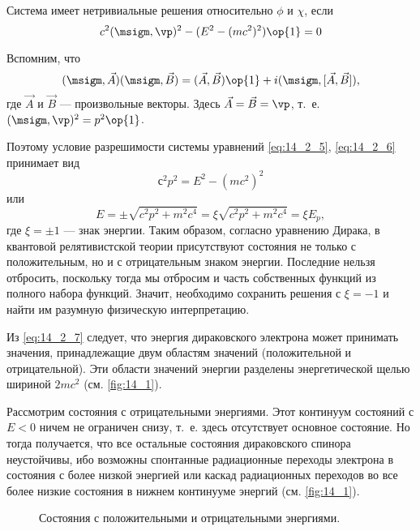 Система имеет нетривиальные решения относительно $\phi$ и $\chi$, если 
$$
c^2 (\msigm, \vp)^2 - (E^2 - (mc^2)^2)\op{1} = 0
$$

Вспомним, что 
$$
(\msigm, \vec{A})(\msigm, \vec{B}) = (\vec{A}, \vec{B}) \op{1} + i(\msigm, [\vec{A}, \vec{B}]),
$$
где $\vec A$ и $\vec B$ --- произвольные векторы. Здесь $\vec{A} = \vec{B} = \vp$, т.~е. $(\msigm, \vp)^2 = p^2 \op{1}$.

Поэтому условие разрешимости системы уравнений \eqref{eq:14_2_5}, \eqref{eq:14_2_6} принимает вид
$$
с^2 p^2 = E^2 - (mc^2)^2
$$
или
\begin{equation}
\label{eq:14_2_7}
\boxed{E = \pm \sqrt{c^2 p^2 + m^2 c^4} = \xi \sqrt{c^2p^2 + m^2 c^4} = \xi E_p},
\end{equation}
где $\xi = \pm 1$ --- знак энергии. Таким образом, согласно уравнению Дирака, в квантовой релятивистской теории присутствуют состояния не только с положительным, но и с отрицательным знаком энергии. Последние нельзя отбросить, поскольку тогда мы отбросим и часть собственных функций из полного набора функций. Значит, необходимо сохранить решения с $\xi = -1$ и найти им разумную физическую интерпретацию.

Из \eqref{eq:14_2_7} следует, что энергия дираковского электрона может принимать значения, принадлежащие двум областям значений (положительной и отрицательной). Эти области значений энергии разделены энергетической щелью шириной $2mc^2$ (см. \autoref{fig:14_1}).

Рассмотрим состояния с отрицательными энергиями. Этот континуум состояний с $E<0$ ничем не ограничен снизу, т.~е. здесь отсутствует основное состояние. Но тогда получается, что все остальные состояния дираковского спинора неустойчивы, ибо возможны спонтанные радиационные переходы электрона в состояния с более низкой энергией или каскад радиационных переходов во все более низкие состояния в нижнем континууме энергий (см. \autoref{fig:14_1}).

\begin{figure}[h!]
\centering
{}
\caption{Состояния с положительными и отрицательными энергиями.} \label{fig:14_1}
\end{figure}

